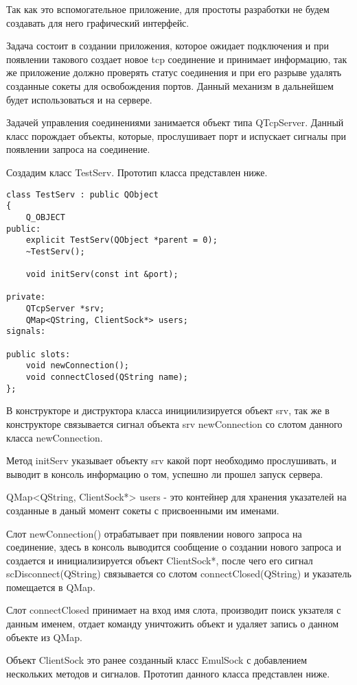 Так как это вспомогательное приложение, для простоты разработки не будем создавать для него графический интерфейс. 

Задача состоит в создании приложения, которое ожидает подключения и при появлении такового создает новое tcp соединение и принимает информацию, так же приложение должно проверять статус соединения и при его разрыве удалять созданные сокеты для освобождения портов. Данный механизм в дальнейшем будет использоваться и на сервере.

Задачей управления соединениями занимается объект типа QTcpServer. Данный класс порождает объекты, которые, прослушивает порт и испускает сигналы при появлении запроса на соединение.

Создадим класс TestServ. Прототип класса представлен ниже.

\begin{lstlisting}
class TestServ : public QObject
{
    Q_OBJECT
public:
    explicit TestServ(QObject *parent = 0);
    ~TestServ();

    void initServ(const int &port);

private:
    QTcpServer *srv;
    QMap<QString, ClientSock*> users;
signals:

public slots:
    void newConnection();
    void connectClosed(QString name);
};
\end{lstlisting}

В конструкторе и диструктора класса инициилизируется объект srv, так же в конструкторе связывается сигнал объекта srv newConnection со слотом данного класса newConnection.

Метод initServ указывает объекту srv какой порт необходимо прослушивать, и выводит в консоль информацию о том, успешно ли прошел запуск сервера.

QMap<QString, ClientSock*> users - это контейнер для хранения указателей на созданные в даный момент сокеты с присвоенными им именами.

Слот newConnection() отрабатывает при появлении нового запроса на соединение, здесь в консоль выводится сообщение о создании нового запроса и создается и инициализируется объект ClientSock*, после чего его сигнал scDisconnect(QString) связывается со слотом connectClosed(QString) и указатель помещается в QMap.

Слот connectClosed принимает на вход имя слота, производит поиск укзателя с данным именем, отдает команду уничтожить объект и удаляет запись о данном объекте из QMap.

Объект ClientSock это ранее созданный класс EmulSock с добавлением нескольких методов и сигналов. Прототип данного класса представлен ниже.

